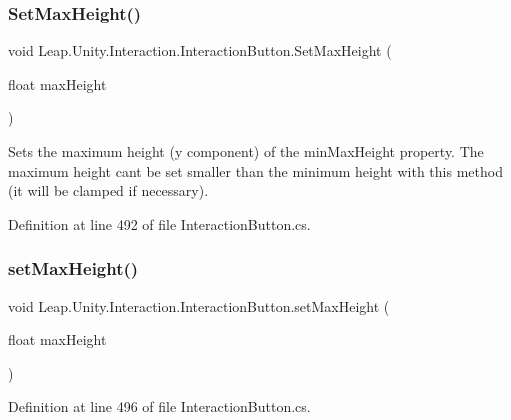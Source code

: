 \mbox{\label{class_leap_1_1_unity_1_1_interaction_1_1_interaction_button_a6545b611053f312e6cf08cf0b5629fbe}} 
\subsubsection{\texorpdfstring{SetMaxHeight()}{SetMaxHeight()}}
{\footnotesize\ttfamily void Leap.\+Unity.\+Interaction.\+Interaction\+Button.\+Set\+Max\+Height (\begin{DoxyParamCaption}\item[{float}]{max\+Height }\end{DoxyParamCaption})}



Sets the maximum height (y component) of the min\+Max\+Height property. The maximum height can\textquotesingle{}t be set smaller than the minimum height with this method (it will be clamped if necessary). 



Definition at line 492 of file Interaction\+Button.\+cs.

\mbox{\label{class_leap_1_1_unity_1_1_interaction_1_1_interaction_button_ad5b904b42f4a3a66875046120ad7edbe}} 
\subsubsection{\texorpdfstring{setMaxHeight()}{setMaxHeight()}}
{\footnotesize\ttfamily void Leap.\+Unity.\+Interaction.\+Interaction\+Button.\+set\+Max\+Height (\begin{DoxyParamCaption}\item[{float}]{max\+Height }\end{DoxyParamCaption})}



Definition at line 496 of file Interaction\+Button.\+cs.


